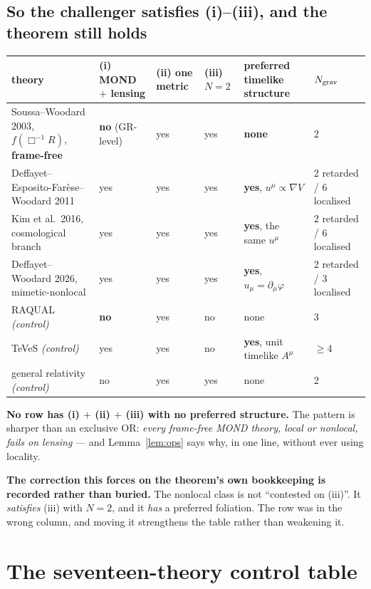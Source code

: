 \documentclass[11pt,letterpaper]{article}
\newcommand{\dal}{\Box}
\begin{document}
\subsection{So the challenger satisfies (i)--(iii), and the theorem still holds}
\begin{center}\small\setlength{\tabcolsep}{4pt}
\begin{tabular}{L{0.245\textwidth}L{0.095\textwidth}L{0.055\textwidth}L{0.05\textwidth}L{0.215\textwidth}L{0.135\textwidth}}\toprule
theory & (i) MOND $+$ lensing & (ii) one metric & (iii) $N{=}2$ & preferred timelike structure & $N_{\rm grav}$\\\midrule
Soussa--Woodard 2003, $f(\dal^{-1}R)$, \textbf{frame-free} \cite{SoussaWoodard2003} & \textbf{no} (GR-level) & yes & yes & \textbf{none} & 2\\
Deffayet--Esposito-Far\`ese--Woodard 2011 \cite{Deffayet2011} & yes & yes & yes & \textbf{yes}, $u^\mu\propto\nabla V$ & 2 retarded / 6 localised\\
Kim et al.\ 2016, cosmological branch \cite{Kim2016} & yes & yes & yes & \textbf{yes}, the same $u^\mu$ & 2 retarded / 6 localised\\
Deffayet--Woodard 2026, mimetic-nonlocal \cite{DeffayetWoodard2026} & yes & yes & yes & \textbf{yes}, $u_\mu=\partial_\mu\varphi$ & 2 retarded / 3 localised\\
RAQUAL \emph{(control)} \cite{BekensteinMilgrom1984} & \textbf{no} & yes & no & none & 3\\
TeVeS \emph{(control)} \cite{Bekenstein2004} & yes & yes & no & \textbf{yes}, unit timelike $A^\mu$ & $\ge4$\\
general relativity \emph{(control)} & no & yes & yes & none & 2\\\bottomrule
\end{tabular}
\end{center}
\textbf{No row has (i) $+$ (ii) $+$ (iii) with no preferred structure.} The pattern is sharper than an exclusive OR: \emph{every frame-free MOND theory, local or nonlocal, fails on lensing} --- and Lemma~\ref{lem:ops} says why, in one line, without ever using locality.

\textbf{The correction this forces on the theorem's own bookkeeping is recorded rather than buried.} The nonlocal class is not ``contested on (iii)''. It \emph{satisfies} (iii) with $N=2$, and it \emph{has} a preferred foliation. The row was in the wrong column, and moving it strengthens the table rather than weakening it.

\section{The seventeen-theory control table}\label{sec:table}
\end{document}
